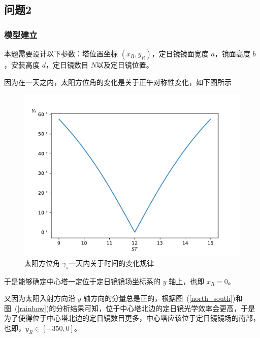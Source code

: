 \subsection{问题2}
\subsubsection{模型建立}
本题需要设计以下参数：塔位置坐标 \((x_{R}, y_{R})\)，定日镜镜面宽度 \(a\)，镜面高度 \(b\)，安装高度 \(d\)，定日镜数目 \(N\)以及定日镜位置。

因为在一天之内，太阳方位角的变化是关于正午对称性变化，如下图所示
\begin{figure}[H]
\centering
\includegraphics[scale = 0.4]{gammas.pdf}
\caption{\kaishu 太阳方位角 \(\gamma_{s}\)一天内关于时间的变化规律}
\end{figure}
于是能够确定中心塔一定位于定日镜镜场坐标系的 \(y\) 轴上，也即 \(x _{R} = 0\)。

又因为太阳入射方向沿 \(y\) 轴方向的分量总是正的，根据图~(\ref{north_south})和图~(\ref{rainbow})的分析结果可知，位于中心塔北边的定日镜光学效率会更高，于是为了使得位于中心塔北边的定日镜数目更多，中心塔应该位于定日镜镜场的南部，也即，\(y _{R} \in [-350 , 0]\)。

